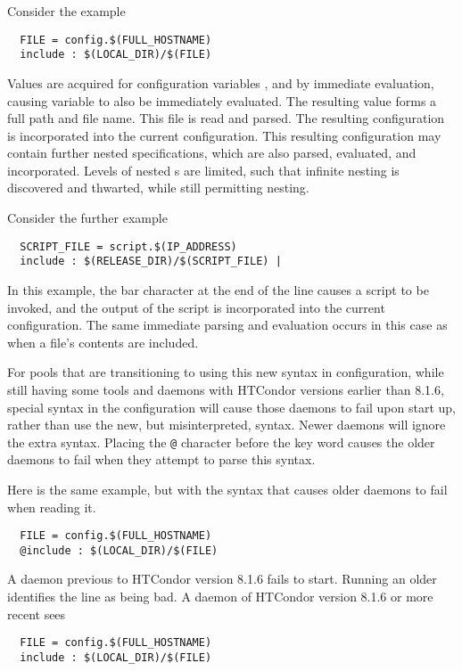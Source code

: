 Consider the example
\begin{verbatim}
  FILE = config.$(FULL_HOSTNAME)
  include : $(LOCAL_DIR)/$(FILE)
\end{verbatim}
Values are acquired for configuration variables 
, and  by immediate evaluation, 
causing variable  to also be immediately evaluated.
The resulting value forms a full path and file name.
This file is read and parsed.
The resulting configuration is incorporated into the current
configuration.
This resulting configuration may contain further nested  
specifications, 
which are also parsed, evaluated, and incorporated.
Levels of nested s are limited,
such that infinite nesting is discovered and thwarted,
while still permitting nesting.

Consider the further example
\begin{verbatim}
  SCRIPT_FILE = script.$(IP_ADDRESS)
  include : $(RELEASE_DIR)/$(SCRIPT_FILE) |
\end{verbatim}
In this example, the bar character at the end of the line 
causes a script to be invoked,
and the output of the script is incorporated into the current
configuration.
The same immediate parsing and evaluation occurs in this
case as when a file's contents are included. 

For pools that are transitioning to using this new syntax in configuration,
while still having some tools and daemons with HTCondor versions 
earlier than 8.1.6,
special syntax in the configuration will cause those daemons to
fail upon start up,
rather than use the new, but misinterpreted, syntax. 
Newer daemons will ignore the extra syntax.
Placing the \verb|@| character before the  key word
causes the older daemons to fail when they attempt to
parse this syntax.

Here is the same example, but with the syntax that causes older daemons
to fail when reading it.
\begin{verbatim}
  FILE = config.$(FULL_HOSTNAME)
  @include : $(LOCAL_DIR)/$(FILE)
\end{verbatim}
A daemon previous to HTCondor version 8.1.6 fails to start.
Running an older  identifies the 
line as being bad.
A daemon of HTCondor version 8.1.6 or more recent sees
\begin{verbatim}
  FILE = config.$(FULL_HOSTNAME)
  include : $(LOCAL_DIR)/$(FILE)
\end{verbatim}


